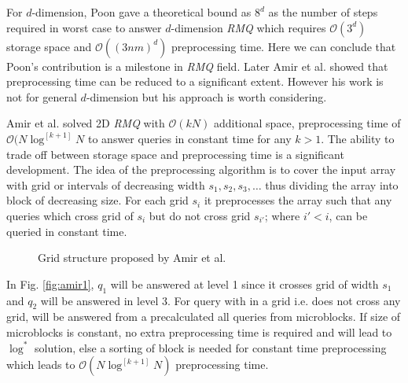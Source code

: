 For $d$-dimension, Poon gave a theoretical bound as $8^d$ as the number of steps required in worst case to answer $d$-dimension \emph{RMQ} which requires $\mathcal{O}(3^d)$ storage space and $\mathcal{O}((3nm)^d)$ preprocessing time. Here we can conclude that Poon's contribution is a milestone in \emph{RMQ} field. Later Amir et al. \cite{p7} showed that preprocessing time can be reduced to a significant extent. However his work is not for general $d$-dimension but his approach is worth considering.


Amir et al. solved 2D \emph{RMQ} with $\mathcal{O}(kN)$ additional space, preprocessing time of $\mathcal{O}(N \log^{[k+1]}N$ to answer queries in constant time for any $k>1$. The ability to trade off between storage space and preprocessing time is a significant development. The idea of the preprocessing algorithm is to cover the input array with grid or intervals of decreasing width $s_1, s_2,s_3,\ldots$ thus dividing the array into block of decreasing size. For each grid $s_i$ it preprocesses the array such that any queries which cross grid of $s_i$ but do not cross grid $s_{i'}$; where $i' < i$, can be queried in constant time. 


\begin{figure}[H]%
    \centering
    \qquad
    \caption{Grid structure proposed by Amir et al. \cite{p7} }%
\end{figure}


In Fig. \ref{fig:amir1}, $q_1$ will be answered at level 1 since it crosses grid of width $s_1$ and $q_2$ will be answered in level 3. For query with in a grid i.e. does not cross any grid, will be answered from a precalculated all queries from microblocks. If size of microblocks is constant, no extra preprocessing time is required and will lead to $\log^*$ solution, else a sorting of block is needed for constant time preprocessing which leads to $\mathcal{O}(N \log^{[k+1]} N)$ preprocessing time.

